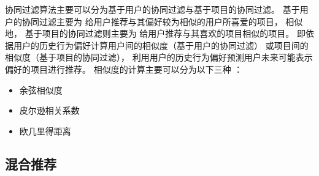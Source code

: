 协同过滤算法主要可以分为基于用户的协同过滤与基于项目的协同过滤。
基于用户的协同过滤主要为
给用户推荐与其偏好较为相似的用户所喜爱的项目，
相似地，
基于项目的协同过滤则主要为
给用户推荐与其喜欢的项目相似的项目。
即依据用户的历史行为偏好计算用户间的相似度（基于用户的协同过滤）
或项目间的相似度（基于项目的协同过滤），
利用用户的历史行为偏好预测用户未来可能表示偏好的项目进行推荐。
相似度的计算主要可以分为以下三种
\cite{heJiYuJuanJiShenJingWangLuoDeYinLeTuiJianXiTong2019}：
\begin{itemize}
    \item 余弦相似度
    \item 皮尔逊相关系数
    \item 欧几里得距离
\end{itemize}

\subsection{混合推荐}
